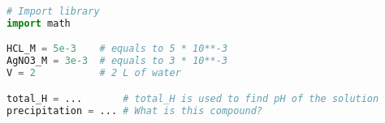 \documentclass[11pt]{article}
\begin{document}
\begin{lstlisting}[language=Python]
# Import library 
import math

HCL_M = 5e-3    # equals to 5 * 10**-3
AgNO3_M = 3e-3  # equals to 3 * 10**-3
V = 2           # 2 L of water

total_H = ...       # total_H is used to find pH of the solution
precipitation = ... # What is this compound?

\end{lstlisting}


\begin{tcolorbox}[colback=black!10!white, colframe=black!75!white, title=\textbf{Answer}]
    \vspace{5cm}
\end{tcolorbox}
\end{document}
